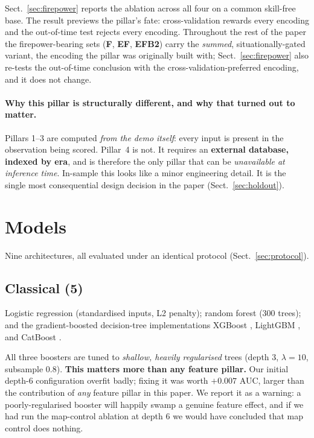 \documentclass[11pt,a4paper]{article}
\begin{document}
Sect.~\ref{sec:firepower} reports the ablation across all four on a common skill-free base.
The result previews the pillar's fate: cross-validation rewards every encoding and the
out-of-time test rejects every encoding. Throughout the rest of the paper the
firepower-bearing sets (\textbf{F}, \textbf{EF}, \textbf{EFB2}) carry the \emph{summed},
situationally-gated variant, the encoding the pillar was originally built with;
Sect.~\ref{sec:firepower} also re-tests the out-of-time conclusion with the
cross-validation-preferred encoding, and it does not change.

\paragraph{Why this pillar is structurally different, and why that turned out to matter.}
Pillars 1--3 are computed \emph{from the demo itself}: every input is present in the
observation being scored. Pillar~4 is not. It requires an \textbf{external database,
indexed by era}, and is therefore the only pillar that can be \emph{unavailable at
inference time}. In-sample this looks like a minor engineering detail. It is the single
most consequential design decision in the paper (Sect.~\ref{sec:holdout}).

\section{Models}
\label{sec:models}

Nine architectures, all evaluated under an identical protocol (Sect.~\ref{sec:protocol}).

\subsection{Classical (5)}
Logistic regression (standardised inputs, L2 penalty); random forest (300 trees); and the
gradient-boosted decision-tree implementations XGBoost \cite{chen2016xgboost}, LightGBM
\cite{ke2017lightgbm}, and CatBoost \cite{prokhorenkova2018catboost}.

All three boosters are tuned to \emph{shallow, heavily regularised} trees (depth 3,
$\lambda = 10$, subsample 0.8). \textbf{This matters more than any feature pillar.} Our
initial depth-6 configuration overfit badly; fixing it was worth $+0.007$ AUC, larger
than the contribution of \emph{any} feature pillar in this paper. We report it as a
warning: a poorly-regularised booster will happily swamp a genuine feature effect, and if
we had run the map-control ablation at depth 6 we would have concluded that map control
does nothing.
\end{document}
